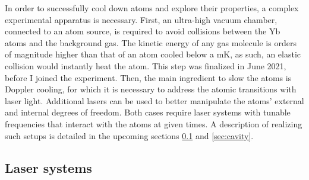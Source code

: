 \documentclass[11pt]{article}
\numberwithin{equation}{section}
\numberwithin{figure}{section}
\begin{document}
In order to successfully cool down atoms and explore their properties, a complex experimental apparatus is necessary. First, an ultra-high vacuum chamber, connected to an atom source, is required to avoid collisions between the Yb atoms and the background gas. The kinetic energy of any gas molecule is orders of magnitude higher than that of an atom cooled below a mK, as such, an elastic collision would instantly heat the atom. This step was finalized in June 2021, before I joined the experiment.
Then, the main ingredient to slow the atoms is Doppler cooling, for which it is necessary to address the atomic transitions with laser light. Additional lasers can be used to better manipulate the atoms' external and internal degrees of freedom. Both cases require laser systems with tunable frequencies that interact with the atoms at given times. A description  of realizing  such setups is detailed in the upcoming sections \ref{sec:laser} and \ref{sec:cavity}.

\subsection{Laser systems}
\label{sec:laser}
\end{document}
